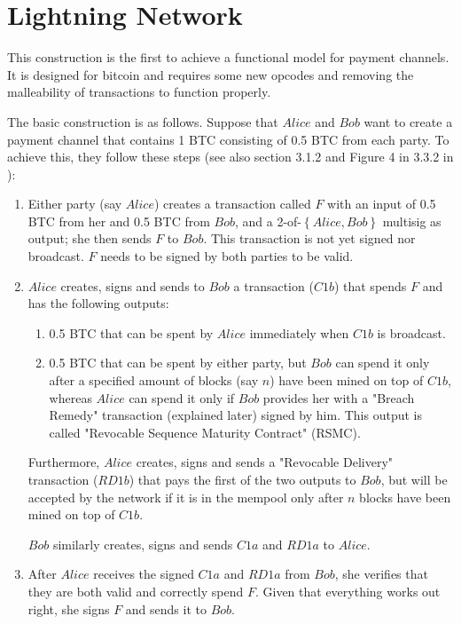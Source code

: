 \section{Lightning Network}
  This construction is the first to achieve a functional model for payment channels. It
  is designed for bitcoin and requires some new opcodes and removing the malleability of
  transactions to function properly.

  The basic construction is as follows. Suppose that $Alice$ and $Bob$ want to create a
  payment channel that contains 1 BTC consisting of 0.5 BTC from each party. To achieve
  this, they follow these steps (see also section 3.1.2 and Figure 4 in 3.3.2 in
  \cite{lightning}):
  \begin{enumerate}
    \item Either party (say $Alice$) creates a transaction called $F$ with an input of 0.5
    BTC from her and 0.5 BTC from $Bob$, and a 2-of-$\left\{Alice, Bob\right\}$ multisig
    as output; she then sends $F$ to $Bob$. This transaction is not yet signed nor
    broadcast. $F$ needs to be signed by both parties to be valid.

    \item $Alice$ creates, signs and sends to $Bob$ a transaction ($C1b$) that spends $F$
    and has the following outputs:
    \begin{enumerate}
      \item 0.5 BTC that can be spent by $Alice$ immediately when $C1b$ is broadcast.
      \item 0.5 BTC that can be spent by either party, but $Bob$ can spend it only after
      a specified amount of blocks (say $n$) have been mined on top of $C1b$, whereas
      $Alice$ can spend it only if $Bob$ provides her with a "Breach Remedy" transaction
      (explained later) signed by him. This output is called "Revocable Sequence Maturity
      Contract" (RSMC).
    \end{enumerate}
    Furthermore, $Alice$ creates, signs and sends a "Revocable Delivery" transaction
    ($RD1b$) that pays the first of the two outputs to $Bob$, but will be accepted by the
    network if it is in the mempool only after $n$ blocks have been mined on top of $C1b$.

    $Bob$ similarly creates, signs and sends $C1a$ and $RD1a$ to $Alice$.

    \item After $Alice$ receives the signed $C1a$ and $RD1a$ from $Bob$, she verifies that
    they are both valid and correctly spend $F$. Given that everything works out right,
    she signs $F$ and sends it to $Bob$.


\end{enumerate}
